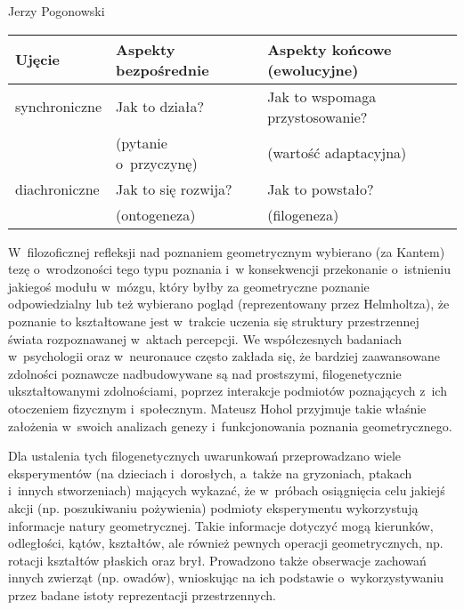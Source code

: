 \begin{newrevplenv}{Jerzy Pogonowski}
\begin{center}
\begin{small}
\begin{tabular}{|l|l|l|}
\hline

Ujęcie & Aspekty bezpośrednie & Aspekty końcowe (ewolucyjne)\\

\hline

synchroniczne & Jak to działa? & Jak to wspomaga przystosowanie?\\

 & (pytanie o~przyczynę) & (wartość adaptacyjna)\\

\hline

diachroniczne & Jak to się rozwija? & Jak to powstało?\\

 & (ontogeneza) & (filogeneza)\\

\hline

\end{tabular}
\end{small}
\end{center}
\medskip

W~filozoficznej refleksji nad poznaniem geometrycznym wybierano
(za Kantem) tezę o~wrodzoności tego typu poznania i~w konsekwencji
przekonanie o~istnieniu jakiegoś modułu w~mózgu, który byłby za
geometryczne poznanie odpowiedzialny lub też wybierano pogląd
(reprezentowany przez Helmholtza), że poznanie to kształtowane
jest w~trakcie uczenia się struktury przestrzennej świata
rozpoznawanej w~aktach percepcji. We współczesnych badaniach w~psychologii oraz w~neuronauce często zakłada się, że bardziej
zaawansowane zdolności poznawcze nadbudowywane są nad prostszymi,
filogenetycznie ukształtowanymi zdolnościami, poprzez interakcje
podmiotów poznających z~ich otoczeniem fizycznym i~społecznym.
Mateusz Hohol przyjmuje takie właśnie założenia w~swoich analizach
genezy i~funkcjonowania poznania geometrycznego.

Dla ustalenia tych filogenetycznych uwarunkowań przeprowa\-dzano
wiele eksperymentów (na dzieciach i~dorosłych, a~także na
gryzoniach, ptakach i~innych stworzeniach) mających wykazać, że w~próbach osiągnięcia celu jakiejś akcji (np. poszukiwaniu
pożywienia) podmioty eksperymentu wykorzystują informacje natury
geometrycznej. Takie informacje dotyczyć mogą kierunków,
odległości, kątów, kształtów, ale również pewnych operacji
geometrycznych, np. rotacji kształtów płaskich oraz brył.
Prowadzono także obserwacje zachowań innych zwierząt (np. owadów),
wnioskując na ich podstawie o~wykorzystywaniu przez badane istoty
reprezentacji przestrzennych.


\end{newrevplenv}
